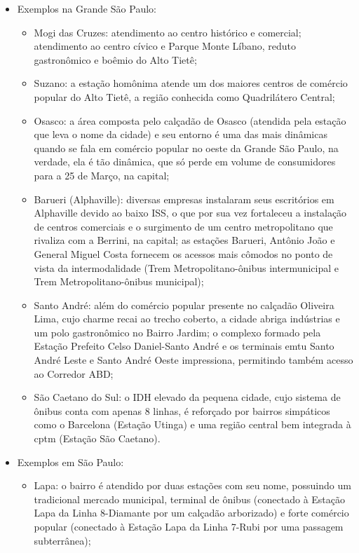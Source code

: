 \documentclass[11pt,fleqn]{book} %
\begin{document}
\begin{itemize}
	\item Exemplos na Grande São Paulo:
		\begin{itemize}
			\item Mogi das Cruzes: atendimento ao centro histórico e comercial; atendimento ao centro cívico e Parque Monte Líbano, reduto gastronômico e boêmio do Alto Tietê;
			\item Suzano: a estação homônima atende um dos maiores centros de comércio popular do Alto Tietê, a região conhecida como Quadrilátero Central;
			\item Osasco: a área composta pelo calçadão de Osasco (atendida pela estação que leva o nome da cidade) e seu entorno é uma das mais dinâmicas quando se fala em comércio popular no oeste da Grande São Paulo, na verdade, ela é tão dinâmica, que só perde em volume de consumidores para a 25 de Março, na capital;
			\item Barueri (Alphaville): diversas empresas instalaram seus escritórios em Alphaville devido ao baixo ISS, o que por sua vez fortaleceu a instalação de centros comerciais e o surgimento de um centro metropolitano que rivaliza com a Berrini, na capital; as estações Barueri, Antônio João e General Miguel Costa fornecem os acessos mais cômodos no ponto de vista da intermodalidade (Trem Metropolitano-ônibus intermunicipal e Trem Metropolitano-ônibus municipal);
			\item Santo André: além do comércio popular presente no calçadão Oliveira Lima, cujo charme recai ao trecho coberto, a cidade abriga indústrias e um polo gastronômico no Bairro Jardim; o complexo formado pela Estação Prefeito Celso Daniel-Santo André e os terminais \gls{emtu} Santo André Leste e Santo André Oeste impressiona, permitindo também acesso ao Corredor ABD;
			\item São Caetano do Sul: o IDH elevado da pequena cidade, cujo sistema de ônibus conta com apenas 8 linhas, é reforçado por bairros simpáticos como o Barcelona (Estação Utinga) e uma região central bem integrada à \gls{cptm} (Estação São Caetano).
		\end{itemize}
	\item Exemplos em São Paulo:
		\begin{itemize}
			\item Lapa: o bairro é atendido por duas estações com seu nome, possuindo um tradicional mercado municipal, terminal de ônibus (conectado à Estação Lapa da Linha 8-Diamante por um calçadão arborizado) e forte comércio popular (conectado à Estação Lapa da Linha 7-Rubi por uma passagem subterrânea);

\end{itemize}
\end{itemize}
\end{document}
